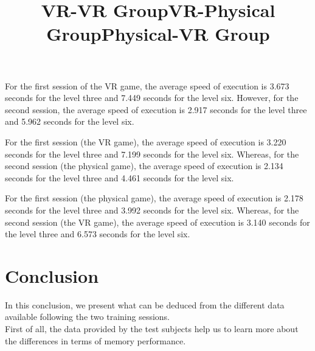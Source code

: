 \documentclass[12pt, openany, twocolumn]{article}
\begin{document}
    \noindent \title{\textbf{VR-VR Group}} \vspace{0.25cm}
    
    For the first session of the VR game, the average speed of execution is 3.673 seconds for the level three and 7.449 seconds for the level six. However, for the second session, the average speed of execution is 2.917 seconds for the level three and 5.962 seconds for the level six.
    \\
    
    \noindent \title{\textbf{VR-Physical Group}} \vspace{0.25cm}
    
    For the first session (the VR game), the average speed of execution is 3.220 seconds for the level three and 7.199 seconds for the level six. Whereas, for the second session (the physical game), the average speed of execution is 2.134 seconds for the level three and 4.461 seconds for the level six.
    \\

    \noindent \title{\textbf{Physical-VR Group}} \vspace{0.25cm}
    
    For the first session (the physical game), the average speed of execution is 2.178 seconds for the level three and 3.992 seconds for the level six. Whereas, for the second session (the VR game), the average speed of execution is 3.140 seconds for the level three and 6.573 seconds for the level six.
    \\
 


\section{Conclusion}
    In this conclusion, we present what can be deduced from the different data available following the two training sessions.
    \\

    First of all, the data provided by the test subjects help us to learn more about the differences in terms of memory performance.
    \\
\end{document}
